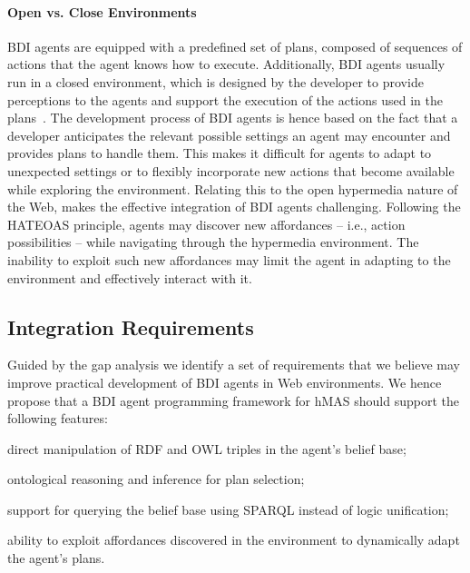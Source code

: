 \documentclass[
]{ceurart}
\begin{document}
\paragraph{Open vs. Close Environments}

\ac{BDI} agents are equipped with a predefined set of plans, composed of sequences of actions that the agent knows how to execute.
%
Additionally, \ac{BDI} agents usually run in a closed environment,
which is designed by the developer to provide perceptions to the agents and 
support the execution of the actions used in the plans~\cite{weyns2007aamas}. 
%
The development process of \ac{BDI} agents is hence based on the fact that a developer anticipates 
the relevant possible settings an agent may encounter and provides plans to handle them.
%
This makes it difficult for agents to adapt to unexpected settings or to flexibly incorporate new actions that become available while exploring the environment.
%
Relating this to the open hypermedia nature of the Web, makes the effective integration of \ac{BDI} agents challenging.
%
Following the \ac{HATEOAS} principle, agents may discover new affordances
-- i.e., action possibilities --
while navigating through the hypermedia environment.
%
The inability to exploit such new affordances may limit the agent in adapting to the environment and effectively interact with it.

\subsection{Integration Requirements}
\label{sec:integrating-bdi-hypermedia}

Guided by the gap analysis
we identify a set of requirements that we believe may improve practical development of \ac{BDI} agents in Web environments.
We hence propose that a \ac{BDI} agent programming framework for \ac{hMAS} should support the following features:
\begin{enumerate*}[label={(R\arabic*)}]
  \item direct manipulation of \ac{RDF} and \ac{OWL} triples in the agent's belief base;
  \label{req:first}
  \item ontological reasoning and inference for plan selection;
  \label{req:second}
  \item support for querying the belief base using \acs{SPARQL} instead of logic unification;
  \label{req:third}
  \item ability to exploit affordances discovered in the environment to dynamically adapt the agent's plans.
  \label{req:fourth}
\end{enumerate*}
\end{document}
